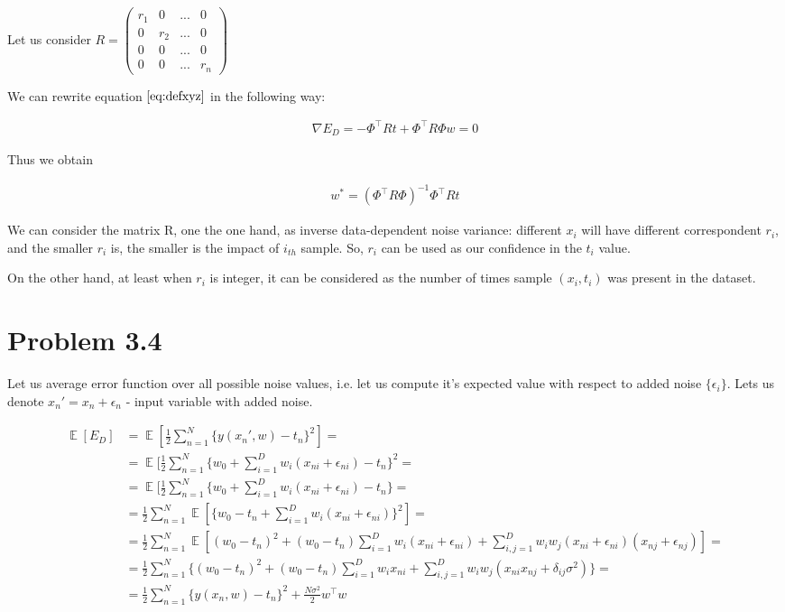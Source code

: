 \documentclass[fleqn]{article}
\DeclareMathOperator{\E}{\mathbb{E}}
\begin{document}
Let us consider $R = \begin{pmatrix}
r_1 & 0 & ... & 0 \\
0 & r_2 & ... & 0 \\
0 & 0 & ... & 0 \\
0 & 0 & ... & r_n
\end{pmatrix}$

We can rewrite equation $\ref{eq:defxyz}$ in the following way:

\begin{align}
\nabla E_D = -\Phi^\top R t + \Phi^\top R \Phi w = 0
\end{align}

Thus we obtain 

\begin{align}
w^* = (\Phi^\top R \Phi) ^{-1}\Phi^\top R t
\end{align}

We can consider the matrix R, one the one hand, as inverse data-dependent noise variance: different $x_i$ will have different correspondent $r_i$, and the smaller $r_i$ is, the smaller is the impact of $i_{th}$ sample. So, $r_i$ can be used as our confidence in the $t_i$ value.

On the other hand, at least when $r_i$ is integer, it can be considered as the number of times sample $(x_i, t_i)$ was present in the dataset.



\section*{Problem 3.4}

Let us average error function over all possible noise values, i.e. let us compute it's expected value with respect to added noise $\{\epsilon_i\}$. Lets us denote $x_n' = x_n + \epsilon_n$ - input variable with added noise.

\begin{align}
\E[E_D] & = \E[\frac{1}{2}\sum\limits_{n=1}^N\{y(x_n',w) - t_n\}^2] = \\ & = \E[\frac{1}{2}\sum\limits_{n=1}^N\{w_0 + \sum\limits_{i=1}^D w_i (x_{ni} + \epsilon_{ni}) - t_n\}^2 = \\ & = \E[\frac{1}{2}\sum\limits_{n=1}^N\{w_0 + \sum\limits_{i=1}^D w_i (x_{ni} + \epsilon_{ni}) - t_n\} = \\ & = \frac{1}{2}\sum\limits_{n=1}^N\E[\{w_0 -t_n + \sum\limits_{i=1}^D w_i (x_{ni} + \epsilon_{ni}) \}^2] = \\
& = \frac{1}{2}\sum\limits_{n=1}^N\E[(w_0-t_n)^2 + (w_0-t_n)\sum\limits_{i=1}^D w_i(x_{ni}+\epsilon_{ni}) + \sum\limits_{i,j=1}^Dw_iw_j(x_{ni}+\epsilon_{ni})(x_{nj}+\epsilon_{nj})] = \\ & = \frac{1}{2}\sum\limits_{n=1}^N\{(w_0-t_n)^2 + (w_0-t_n)\sum\limits_{i=1}^D w_ix_{ni} + \sum\limits_{i,j=1}^Dw_iw_j(x_{ni}x_{nj} + \delta_{ij}\sigma^2) \} = \\
& = \frac{1}{2}\sum\limits_{n=1}^N\{y(x_n,w) - t_n\}^2 + \frac{N \sigma^2}{2}w^\top w
\end{align}
\end{document}

